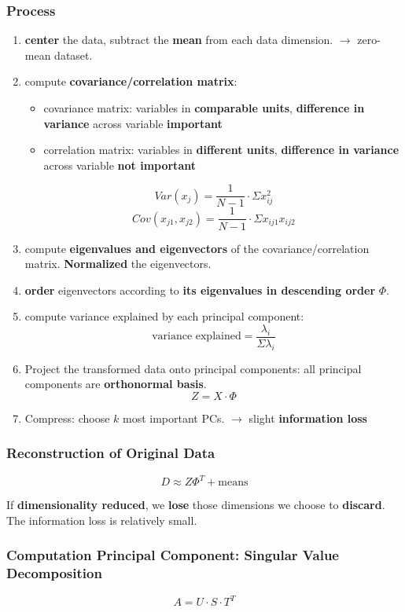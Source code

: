 \subsubsection{Process}
\begin{enumerate}[label= \protect \circled{\arabic*} ]
	\item \textbf{center} the data, subtract the \textbf{mean} from each data dimension. $\rightarrow$ zero-mean dataset.
	\item compute \textbf{covariance/correlation matrix}:
	\begin{itemize}
		\item covariance matrix: variables in \textbf{comparable units}, \textbf{difference in variance} across variable \textbf{important}
		\item correlation matrix: variables in \textbf{different units}, \textbf{difference in variance} across variable \textbf{not important}
	\end{itemize}
	$$Var(x_j) =  \frac{1}{N-1} \cdot\Sigma x_{ij}^2$$
	$$Cov(x_{j1}, x_{j2}) = \frac{1}{N-1} \cdot \Sigma x_{ij1} x_{ij2} $$
	
	\item compute \textbf{eigenvalues and eigenvectors} of the covariance/correlation matrix. \textbf{Normalized} the eigenvectors.
	\item \textbf{order} eigenvectors according to \textbf{its eigenvalues in descending order} $\Phi$.
	\item compute variance explained by each principal component:
	$$\text{variance explained} = \frac{\lambda_i}{\Sigma \lambda_i}$$
	\item Project the transformed data onto principal components: all principal components are \textbf{orthonormal basis}.
	$$Z = X\cdot \Phi$$
	\item Compress: choose $k$ most important PCs. $\rightarrow$ slight \textbf{information loss}
\end{enumerate}

\subsubsection{Reconstruction of Original Data}
$$D \approx Z \Phi^T + \text{means}$$

If \textbf{dimensionality reduced}, we \textbf{lose} those dimensions we choose to \textbf{discard}. The information loss is relatively small.
\subsubsection{Computation Principal Component: Singular Value Decomposition}
$$A = U\cdot S \cdot T^{T}$$

